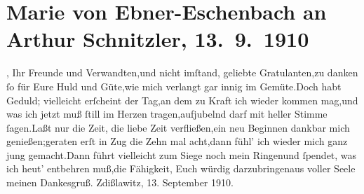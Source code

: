 

         \renewcommand{\erwaehnteOrte}{Orte: Wien, Zdislavice}
         \renewcommand{\erwaehnteWerke}{}
               \section[Marie von Ebner-Eschenbach an Arthur Schnitzler, 13. 9. 1910]{ Marie von Ebner-Eschenbach an Arthur Schnitzler, 13. 9. 1910}\nopagebreak{}\rehead{ }\begin{ledgroupsized}[t]{13cm}\normalsize\beginnumbering \toendnotes[C]{\smallbreak\pagebreak[2]} 
\toendnotes[C]{\smallbreak}\stanza{}{\pb}\label{K_L02580-1v}\label{K_L02580-1h}, Ihr Freunde und
                  Verwandten,\newverse{}und nicht imſtand, geliebte Gratulanten,\newverse{}zu danken ſo für Eure Huld und Güte,\newverse{}wie mich verlangt gar innig im Gemüte.\newverse{}Doch habt Geduld; vielleicht erſcheint der Tag,\newverse{}an dem zu Kraft ich wieder kommen mag,\newverse{}und was ich jetzt muß ſtill im Herzen tragen,\newverse{}aufjubelnd darf mit heller Stimme ſagen.\newverse{}Laßt nur die Zeit, die liebe Zeit verfließen,\newverse{}ein neu Beginnen dankbar mich genießen;\newverse{}geraten erſt in Zug die Zehn mal acht,\newverse{}dann fühl’ ich wieder mich ganz jung gemacht.\newverse{}Dann führt vielleicht zum Siege noch mein Ringen\newverse{}und ſpendet, was ich heut’ entbehren muß,\newverse{}die Fähigkeit, Euch würdig darzubringen\newverse{}aus voller Seele meinen Dankesgruß.\stanzaend{}\pstart \spacefill\mbox{}\pend{}\pstart
           Zdißlawitz, 13. September
                  1910.\pend
           
         
         \endnumbering{}\end{ledgroupsized}  \newcommand{\dateiname}{L02580}\newcommand{\titel}{Marie von Ebner-Eschenbach an Arthur Schnitzler, 13. 9. 1910}\newcommand{\editorInnen}{Martin Anton Müller und Laura Untner}
      